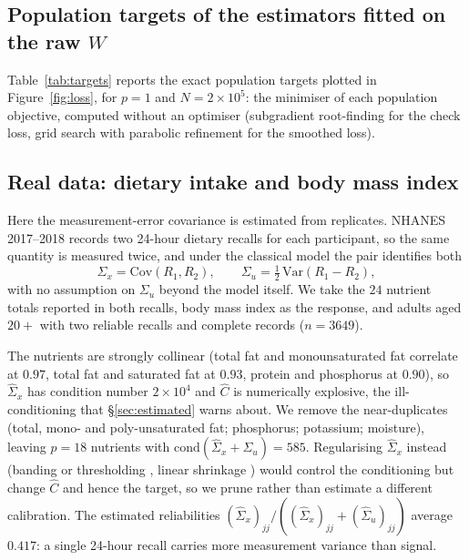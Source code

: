 \documentclass[12pt,a4paper]{article}
\theoremstyle{definition}
\theoremstyle{remark}
\newcommand{\Ccal}{C}
\begin{document}
\subsection{Population targets of the estimators fitted on the raw $W$}
\label{sec:targets-si}

Table~\ref{tab:targets} reports the exact population targets plotted in Figure~\ref{fig:loss},
for $p=1$ and $N=2\times10^5$: the minimiser of each population objective, computed without an
optimiser (subgradient root-finding for the check loss, grid search with parabolic refinement
for the smoothed loss).



\subsection{Real data: dietary intake and body mass index}
\label{sec:nhanes-si}

Here the measurement-error covariance is estimated from replicates.
NHANES 2017--2018 records two 24-hour dietary recalls for each participant, so the same
quantity is measured twice, and under the classical model the pair identifies both
\begin{equation}
\Sigma_x = \mathrm{Cov}(R_1,R_2),
\qquad
\Sigma_u = \tfrac12\,\mathrm{Var}(R_1-R_2),
\label{eq:replicates}
\end{equation}
with no assumption on $\Sigma_u$ beyond the model itself. We take the $24$ nutrient totals
reported in both recalls, body mass index as the response, and adults aged $20+$ with two
reliable recalls and complete records ($n=3649$).

The nutrients are strongly collinear (total fat and monounsaturated fat correlate at
$0.97$, total fat and saturated fat at $0.93$, protein and phosphorus at $0.90$), so
$\hat\Sigma_x$ has condition number $2\times10^4$ and $\hat\Ccal$ is numerically explosive,
the ill-conditioning that \S\ref{sec:estimated} warns about. We remove the near-duplicates
(total, mono- and poly-unsaturated fat; phosphorus; potassium; moisture), leaving $p=18$
nutrients with $\mathrm{cond}(\hat\Sigma_x+\Sigma_u)
= 585$. Regularising $\hat\Sigma_x$ instead (banding or thresholding \citep{bickel2008},
linear shrinkage \citep{ledoit2004}) would control the conditioning but change $\hat\Ccal$
and hence the target, so we prune rather than estimate a different calibration. The
estimated reliabilities $(\hat\Sigma_x)_{jj}/((\hat\Sigma_x)_{jj}+(\hat\Sigma_u)_{jj})$
average $0.417$: a single 24-hour recall carries more measurement variance than signal.
\end{document}
